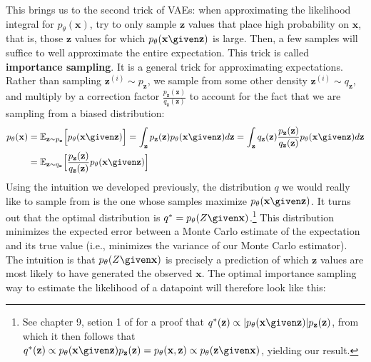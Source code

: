 This brings us to the second trick of VAEs: when approximating the likelihood integral for $p_{\theta}(\mathbf{x})$, try to only sample $\mathbf{z}$ values that place high probability on $\mathbf{x}$, that is, those $\mathbf{z}$ values for which $p_{\theta}(\mathbf{x} \given \mathbf{z})$ is large. Then, a few samples will suffice to well approximate the entire expectation. This trick is called \textbf{importance sampling}. It is a general trick for approximating expectations. Rather than sampling $\mathbf{z}^{(i)} \sim p_{\mathbf{z}}$, we sample from some other density $\mathbf{z}^{(i)} \sim q_{\mathbf{z}}$, and multiply by a correction factor $\frac{p_{\mathbf{z}}(\mathbf{z})}{q_{\mathbf{z}}(\mathbf{z})}$ to account for the fact that we are sampling from a biased distribution:
\begin{align}
p_{\theta}(\mathbf{x}) &= \mathbb{E}_{\mathbf{z}\sim p_{\mathbf{z}}}\Big[p_{\theta}(\mathbf{x} \given \mathbf{z})\Big]
= \int_{\mathbf{z}} p_{\mathbf{z}}(\mathbf{z}) p_{\theta}(\mathbf{x} \given \mathbf{z}) d\mathbf{z}
= \int_{\mathbf{z}} q_{\mathbf{z}}(\mathbf{z})\frac{p_{\mathbf{z}}(\mathbf{z})}{q_{\mathbf{z}}(\mathbf{z})} p_{\theta}(\mathbf{x} \given \mathbf{z}) d\mathbf{z}\\
&= \mathbb{E}_{\mathbf{z}\sim q_{\mathbf{z}}}\Big[\frac{p_{\mathbf{z}}(\mathbf{z})}{q_{\mathbf{z}}(\mathbf{z})} p_{\theta}(\mathbf{x} \given \mathbf{z})\Big]\label{eqn:generative_modeling_and_representation_learning:vae_learning_problem2}
\end{align}
Using the intuition we developed previously, the distribution $q$ we would really like to sample from is the one whose samples maximize $p_{\theta}(\mathbf{x} \given \mathbf{z})$. It turns out that the optimal distribution is $q^* = p_{\theta}(Z \given \mathbf{x})$.\footnote{See chapter 9, setion 1 of \cite{mcbook} for a proof that $q^*(\mathbf{z}) \propto \lvert p_{\theta}(\mathbf{x} \given \mathbf{z}) \rvert p_{\mathbf{z}}(\mathbf{z})$, from which it then follows that $q^*(\mathbf{z}) \propto p_{\theta}(\mathbf{x} \given \mathbf{z})p_{\mathbf{z}}(\mathbf{z}) = p_{\theta}(\mathbf{x}, \mathbf{z}) \propto p_{\theta}(\mathbf{z} \given \mathbf{x})$, yielding our result.} This distribution minimizes the expected error between a Monte Carlo estimate of the expectation and its true value (i.e., minimizes the variance of our Monte Carlo estimator). The intuition is that $p_{\theta}(Z \given \mathbf{x})$ is precisely a prediction of which $\mathbf{z}$ values are most likely to have generated the observed $\mathbf{x}$. The optimal importance sampling way to estimate the likelihood of a datapoint will therefore look like this:

